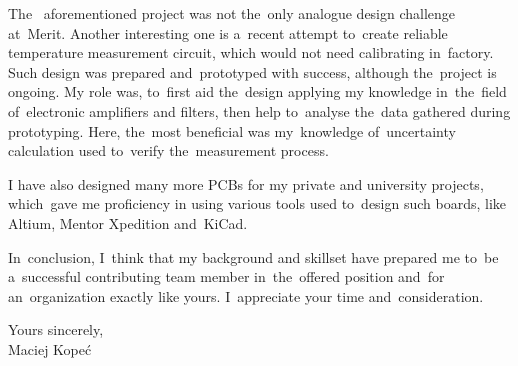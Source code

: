 \documentclass[11pt,a4paper,sans]{article}
\begin{document}
	The~ aforementioned project was not the~only analogue design challenge at~Merit. Another 
	interesting one is a~recent
	attempt to~create reliable temperature measurement circuit, which would not need calibrating
	in~factory. Such design was prepared and~prototyped with success, although the~project is 
	ongoing. My role was, to~first aid the~design applying my knowledge 
	in~the~field of~electronic amplifiers and filters, then help to~analyse the~data gathered
	during prototyping. Here, the~most beneficial was my~knowledge of~uncertainty calculation used 
	to~verify the~measurement process.
	
	I have also designed many more PCBs for my private and university projects, which~gave me
	proficiency in using various tools used to~design such boards, like Altium, Mentor Xpedition
	and~KiCad.
	
	In~conclusion, I~think that my background and skillset have prepared me to~be a~successful 
	contributing team member in~the~offered position and~for an~organization exactly like 
	yours. I~appreciate your time and~consideration.

	\vspace{1\baselineskip}
	\hfill
	\begin{minipage}{0.3\linewidth}
		\begin{flushleft}
			Yours sincerely,
			\\\vspace{3\baselineskip}
			Maciej Kopeć
		\end{flushleft}
	\end{minipage}
	
\end{document}

